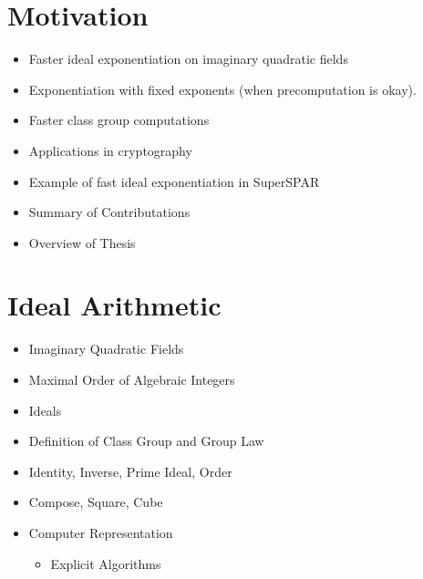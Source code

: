 \documentclass[11pt, letterpaper]{article}
\theoremstyle{definition}
\begin{document}
\section{Motivation}
\begin{itemize}
\item Faster ideal exponentiation on imaginary quadratic fields
\item Exponentiation with fixed exponents (when precomputation is okay).
\item Faster class group computations
\item Applications in cryptography
\item Example of fast ideal exponentiation in SuperSPAR
\item Summary of Contributations
\item Overview of Thesis
\end{itemize}


\bigbreak
\section{Ideal Arithmetic}
\begin{itemize}
\item Imaginary Quadratic Fields
\item Maximal Order of Algebraic Integers
\item Ideals
\item Definition of Class Group and Group Law
\item Identity, Inverse, Prime Ideal, Order
\item Compose, Square, Cube
\item Computer Representation
	\begin{itemize}
	\item Explicit Algorithms
	\end{itemize}
\end{itemize}

\bigbreak
\end{document}

